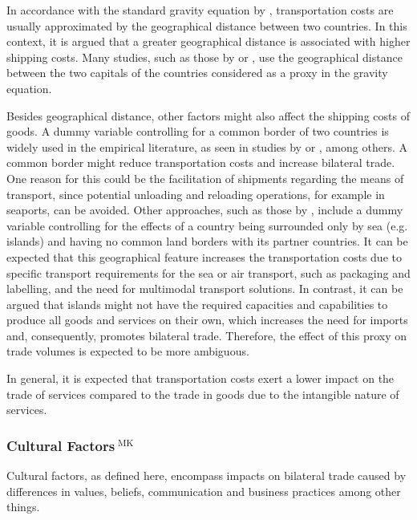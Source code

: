 In accordance with the standard gravity equation by \textcite{tinbergen1962shaping}, transportation costs are usually approximated by the geographical distance between two countries. In this context, it is argued that a greater geographical distance is associated with higher shipping costs. Many studies, such as those by \textcite{Kimura2006} or \textcite{DAS2023106246}, use the geographical distance between the two capitals of the countries considered as a proxy in the gravity equation.  

Besides geographical distance, other factors might also affect the shipping costs of goods. A dummy variable controlling for a common border of two countries is widely used in the empirical literature, as seen in studies by \textcite{Kimura2006} or \textcite{DAS2023106246}, among others. A common border might reduce transportation costs and increase bilateral trade. One reason for this could be the facilitation of shipments regarding the means of transport, since potential unloading and reloading operations, for example in seaports, can be avoided. Other approaches, such as those by \textcite{SANTANAGALLEGO20161026}, include a dummy variable controlling for the effects of a country being surrounded only by sea (e.g. islands) and having no common land borders with its partner countries. It can be expected that this geographical feature increases the transportation costs due to specific transport requirements for the sea or air transport, such as packaging and labelling, and the need for multimodal transport solutions. In contrast, it can be argued that islands might not have the required capacities and capabilities to produce all goods and services on their own, which increases the need for imports and, consequently, promotes bilateral trade. Therefore, the effect of this proxy on trade volumes is expected to be more ambiguous. 

In general, it is expected that transportation costs exert a lower impact on the trade of services compared to the trade in goods due to the intangible nature of services. 

\subsubsection[Cultural Factors]{Cultural Factors$^{\text{ MK}}$}
\label{sec:culture}

Cultural factors, as defined here, encompass impacts on bilateral trade caused by differences in values, beliefs, communication and business practices among other things.

